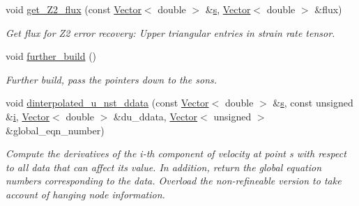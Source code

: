\begin{DoxyCompactItemize}
void \hyperlink{classoomph_1_1RefineableGeneralisedNewtonianNavierStokesEquations_a6b9bbaa731432a9a9fe13e53095a78d8}{get\+\_\+\+Z2\+\_\+flux} (const \hyperlink{classoomph_1_1Vector}{Vector}$<$ double $>$ \&\hyperlink{cfortran_8h_ab7123126e4885ef647dd9c6e3807a21c}{s}, \hyperlink{classoomph_1_1Vector}{Vector}$<$ double $>$ \&flux)
\begin{DoxyCompactList}\small\item\em Get \textquotesingle{}flux\textquotesingle{} for Z2 error recovery\+: Upper triangular entries in strain rate tensor. \end{DoxyCompactList}\item 
void \hyperlink{classoomph_1_1RefineableGeneralisedNewtonianNavierStokesEquations_a53a4c5277d517f5df48df7c1953b2b02}{further\+\_\+build} ()
\begin{DoxyCompactList}\small\item\em Further build, pass the pointers down to the sons. \end{DoxyCompactList}\item 
void \hyperlink{classoomph_1_1RefineableGeneralisedNewtonianNavierStokesEquations_a00a1486786f3b1782fd7fb19cddf5cf4}{dinterpolated\+\_\+u\+\_\+nst\+\_\+ddata} (const \hyperlink{classoomph_1_1Vector}{Vector}$<$ double $>$ \&\hyperlink{cfortran_8h_ab7123126e4885ef647dd9c6e3807a21c}{s}, const unsigned \&\hyperlink{cfortran_8h_adb50e893b86b3e55e751a42eab3cba82}{i}, \hyperlink{classoomph_1_1Vector}{Vector}$<$ double $>$ \&du\+\_\+ddata, \hyperlink{classoomph_1_1Vector}{Vector}$<$ unsigned $>$ \&global\+\_\+eqn\+\_\+number)
\begin{DoxyCompactList}\small\item\em Compute the derivatives of the i-\/th component of velocity at point s with respect to all data that can affect its value. In addition, return the global equation numbers corresponding to the data. Overload the non-\/refineable version to take account of hanging node information. \end{DoxyCompactList}\end{DoxyCompactItemize}
